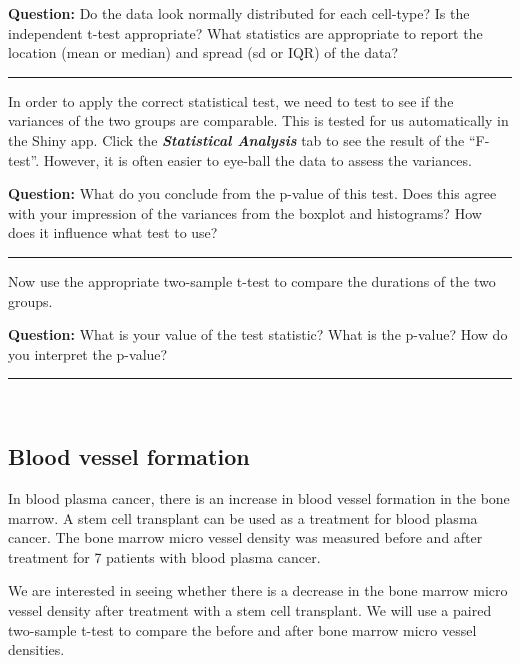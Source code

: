 \documentclass[]{article}
\begin{document}
{\textbf{Question:}} Do the data look normally distributed for each
cell-type? Is the independent t-test appropriate? What statistics are
appropriate to report the location (mean or median) and spread (sd or
IQR) of the data?

\begin{center}\rule{0.5\linewidth}{\linethickness}\end{center}

In order to apply the correct statistical test, we need to test to see
if the variances of the two groups are comparable. This is tested for us
automatically in the Shiny app. Click the \textbf{\emph{Statistical
Analysis}} tab to see the result of the ``F-test''. However, it is often
easier to eye-ball the data to assess the variances.

{\textbf{Question:}} What do you conclude from the p-value of this test.
Does this agree with your impression of the variances from the boxplot
and histograms? How does it influence what test to use?

\begin{center}\rule{0.5\linewidth}{\linethickness}\end{center}

Now use the appropriate two-sample t-test to compare the durations of
the two groups.

{\textbf{Question:}} What is your value of the test statistic? What is
the p-value? How do you interpret the p-value?

\begin{center}\rule{0.5\linewidth}{\linethickness}\end{center}

~

\hypertarget{blood-vessel-formation-1}{%
\subsection{Blood vessel formation}\label{blood-vessel-formation-1}}

In blood plasma cancer, there is an increase in blood vessel formation
in the bone marrow. A stem cell transplant can be used as a treatment
for blood plasma cancer. The bone marrow micro vessel density was
measured before and after treatment for 7 patients with blood plasma
cancer.

We are interested in seeing whether there is a decrease in the bone
marrow micro vessel density after treatment with a stem cell transplant.
We will use a paired two-sample t-test to compare the before and after
bone marrow micro vessel densities.
\end{document}
